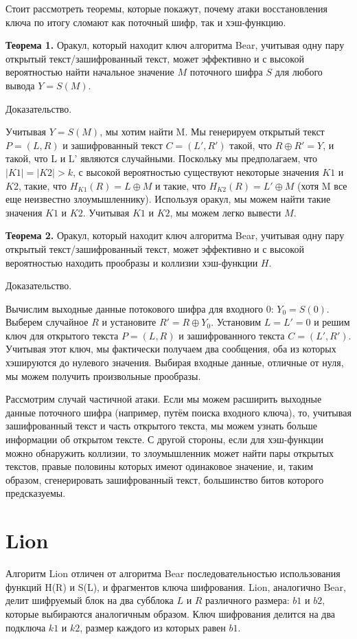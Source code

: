 \documentclass[12pt]{article}
\begin{document}
Стоит рассмотреть теоремы, которые покажут, почему атаки восстановления ключа по итогу сломают как поточный шифр, так и хэш-функцию.    

\vspace{5mm}
\textbf{Теорема 1.} Оракул, который находит ключ алгоритма Bear, учитывая одну пару открытый текст/зашифрованный текст, может эффективно и с высокой вероятностью найти начальное значение $M$ поточного шифра $S$ для любого вывода $Y = S(M)$.

Доказательство. 

Учитывая $Y = S (M)$, мы хотим найти M. Мы генерируем открытый текст $P = (L, R)$
и зашифрованный текст $C = (L', R')$ такой, что $R \oplus R' = Y$, и такой, что L и L'
являются случайными. Поскольку мы предполагаем, что $|K1| = |K2| > k$, с высокой вероятностью
существуют некоторые значения $K1$ и $K2$, такие, что $H_{K1}(R) = L \oplus M$ и такие, что
$H_{K2}(R) = L' \oplus M$ (хотя M все еще неизвестно злоумышленнику). Используя
оракул, мы можем найти такие значения $K1$ и $K2$. Учитывая $K1$ и $K2$, мы можем легко
вывести $M$.

\vspace{5mm}
\textbf{Теорема 2.} Оракул, который находит ключ алгоритма Bear, учитывая одну пару открытый текст/зашифрованный текст, может эффективно и с высокой вероятностью находить прообразы и коллизии
хэш-функции $H$.

Доказательство. 

Вычислим выходные данные потокового шифра для входного 0: $Y_{0} = S(0)$.
Выберем случайное $R$ и установите $R' = R \oplus Y_{0}$. Установим $L = L' = 0$ и решим ключ для открытого текста $P = (L, R)$ и зашифрованного текста $C = (L', R')$. Учитывая этот ключ, мы фактически получаем два сообщения, оба из которых хэшируются до нулевого значения. Выбирая входные данные, отличные от нуля, мы можем получить произвольные прообразы.

\vspace{5mm}
Рассмотрим случай частичной атаки. Если мы можем расширить выходные данные поточного шифра (например, путём поиска входного ключа), то, учитывая зашифрованный текст и часть открытого текста, мы можем узнать больше информации об открытом тексте. С другой стороны, если для хэш-функции можно обнаружить коллизии, то злоумышленник может найти пары открытых текстов, правые половины которых имеют одинаковое значение, и, таким образом, сгенерировать зашифрованный текст, большинство битов которого предсказуемы.


\section{Lion}
Алгоритм Lion отличен от алгоритма Bear последовательностью использования функций H(R) и S(L), и фрагментов ключа шифрования. Lion, аналогично Bear, делит шифруемый блок на два субблока $L$ и $R$ различного размера: $b1$ и $b2$, которые выбираются аналогичным образом. Ключ шифрования делится на два подключа $k1$ и $k2$, размер каждого из которых равен $b1$.
\end{document}

